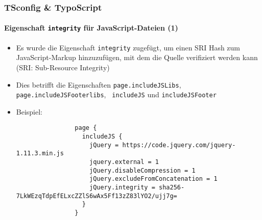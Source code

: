\begin{frame}[fragile]
	\frametitle{TSconfig \& TypoScript}
	\framesubtitle{Eigenschaft \texttt{integrity} für JavaScript-Dateien (1)}

	\lstset{basicstyle=\tiny\ttfamily}

	\begin{itemize}

		\item Es wurde die Eigenschaft \texttt{integrity} zugefügt, um einen
			SRI Hash zum JavaScript-Markup hinzuzufügen, mit dem die Quelle
			verifiziert werden kann (SRI: Sub-Resource Integrity)

		\item Dies betrifft die Eigenschaften \texttt{page.includeJSLibs},
			\texttt{page.includeJSFooterlibs}, \texttt{ includeJS} und
			\texttt{includeJSFooter}

		\item Beispiel:

			\begin{lstlisting}
				page {
				  includeJS {
				    jQuery = https://code.jquery.com/jquery-1.11.3.min.js
				    jquery.external = 1
				    jQuery.disableCompression = 1
				    jQuery.excludeFromConcatenation = 1
				    jQuery.integrity = sha256-7LkWEzqTdpEfELxcZZlS6wAx5Ff13zZ83lYO2/ujj7g=
				  }
				}
			\end{lstlisting}

	\end{itemize}

\end{frame}


